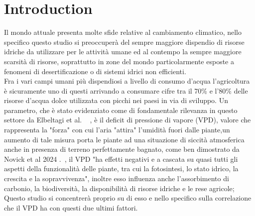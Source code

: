 \chapter{Introduction}
Il mondo attuale presenta molte sfide relative al cambiamento climatico, nello specifico questo studio si preoccuperà del sempre maggiore dispendio di risorse idriche da utilizzare per le attività umane ed al contempo la sempre maggiore scarsità di risorse, soprattutto in zone del mondo particolarmente esposte a fenomeni di desertificazione o di sistemi idrici non efficienti.\\
Fra i vari campi umani più dispendiosi a livello di consumo d'acqua l'agricoltura è sicuramente uno di questi arrivando a consumare cifre tra il 70\% e l'80\% delle risorse d'acqua dolce utilizzata con picchi nei paesi in via di sviluppo. Un parametro, che è stato evidenziato come di fondamentale rilevanza in questo settore da Elbeltagi et al. ~\cite{elbeltagi2023vpd} , è il  deficit di pressione di vapore (VPD), valore che rappresenta la "forza" con cui l'aria "attira" l'umidità fuori dalle piante,un aumento di tale misura porta  le piante ad una situazione di siccità atmosferica anche in presenza di terreno perfettamente bagnato, come ben dimostrato da Novick et al 2024 .~\cite{novick2024vpd}, il VPD "ha effetti negativi e a cascata su quasi tutti gli aspetti della funzionalità delle piante, tra cui la fotosintesi, lo stato idrico, la crescita e la sopravvivenza", inoltre esso influenza anche l'assorbimento di carbonio, la biodiversità, la disponibilità di risorse idriche e le rese agricole; Questo studio si concentrerà proprio su di esso e nello specifico sulla correlazione che il VPD ha con questi due ultimi fattori.\\
